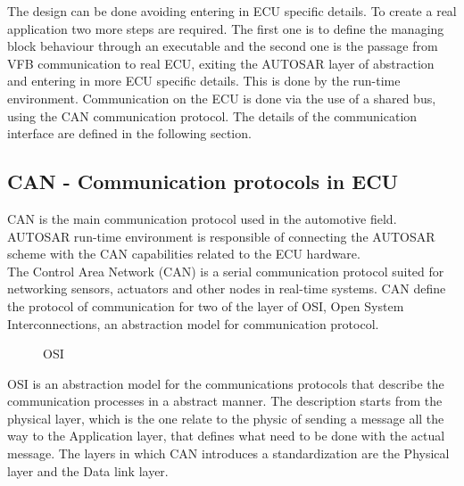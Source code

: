 \documentclass[../main.tex]{subfiles}
\begin{document}
The design can be done avoiding entering in \gls{ECU} specific details. To create a real application two more steps are required. The first one is to define the managing block behaviour through an executable and the second one is the passage from \gls{VFB} communication to real \gls{ECU}, exiting the \gls{AUTOSAR} layer of abstraction and entering in more \gls{ECU} specific details. This is done by the run-time environment.
Communication on the ECU is done via the use of a shared \gls{bus}, using the \gls{CAN} communication protocol. The details of the communication interface are defined in the following section.

\subsection{CAN - Communication protocols in ECU}
\gls{CAN} is the main communication protocol used in the automotive field. \gls{AUTOSAR} run-time environment is responsible of connecting the \gls{AUTOSAR} scheme with the \gls{CAN} capabilities related to the \gls{ECU} hardware.\\
The Control Area Network (\gls{CAN}) is a serial communication protocol suited for networking sensors, actuators and other nodes in real-time systems. \gls{CAN} define the protocol of communication for two of the layer of \gls{OSI}, Open System Interconnections, an abstraction model for communication protocol. 
\begin{figure}[H]
    \centering
{}
    \caption{OSI}
    \label{fig:ECUstructure}
\end{figure}
\gls{OSI} is an abstraction model for the communications protocols that describe the communication processes in a abstract manner. The description starts from the physical layer, which is the one relate to the physic of sending a message all the way to the Application layer, that defines what need to be done with the actual message. The layers in which \gls{CAN} introduces a standardization are the Physical layer and the Data link layer.\\
\end{document}
